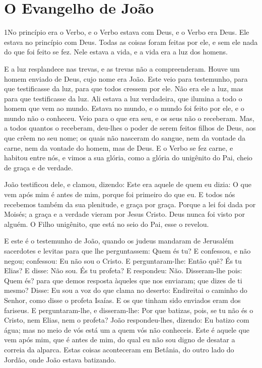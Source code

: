 \chapter*{O Evangelho de João}

\lettrine{1} No princípio era o Verbo, e o Verbo estava com
Deus, e o Verbo era Deus. Ele estava no princípio com Deus.
Todas as coisas foram feitas por ele, e sem ele nada do que foi
feito se fez. Nele estava a vida, e a vida era a luz dos homens.

E a luz resplandece nas trevas, e as trevas não a compreenderam.
Houve um homem enviado de Deus, cujo nome era João. Este
veio para testemunho, para que testificasse da luz, para que todos
cressem por ele. Não era ele a luz, mas para que testificasse da
luz. Ali estava a luz verdadeira, que ilumina a todo o homem que
vem ao mundo. Estava no mundo, e o mundo foi feito por ele, e
o mundo não o conheceu. Veio para o que era seu, e os seus
não o receberam. Mas, a todos quantos o receberam, deu-lhes o
poder de serem feitos filhos de Deus, aos que crêem no seu nome;
os quais não nasceram do sangue, nem da vontade da carne, nem
da vontade do homem, mas de Deus. E o Verbo se fez carne, e
habitou entre nós, e vimos a sua glória, como a glória do unigênito
do Pai, cheio de graça e de verdade.

João testificou dele, e clamou, dizendo: Este era aquele de quem
eu dizia: O que vem após mim é antes de mim, porque foi primeiro do
que eu. E todos nós recebemos também da sua plenitude, e
graça por graça. Porque a lei foi dada por Moisés; a graça e
a verdade vieram por Jesus Cristo. Deus nunca foi visto por
alguém. O Filho unigênito, que está no seio do Pai, esse o revelou.

E este é o testemunho de João, quando os judeus mandaram de
Jerusalém sacerdotes e levitas para que lhe perguntassem: Quem és
tu? E confessou, e não negou; confessou: Eu não sou o Cristo.
E perguntaram-lhe: Então quê? És tu Elias? E disse: Não sou.
És tu profeta? E respondeu: Não. Disseram-lhe pois: Quem és?
para que demos resposta àqueles que nos enviaram; que dizes de ti
mesmo? Disse: Eu sou a voz do que clama no deserto:
Endireitai o caminho do Senhor, como disse o profeta Isaías.
E os que tinham sido enviados eram dos fariseus. E
perguntaram-lhe, e disseram-lhe: Por que batizas, pois, se tu não és
o Cristo, nem Elias, nem o profeta? João respondeu-lhes,
dizendo: Eu batizo com água; mas no meio de vós está um a quem vós
não conheceis. Este é aquele que vem após mim, que é antes de
mim, do qual eu não sou digno de desatar a correia da alparca.
Estas coisas aconteceram em Betânia, do outro lado do Jordão,
onde João estava batizando.

